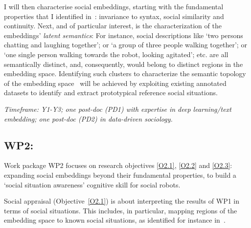 I will then characterise social embeddings, starting with the fundamental
properties that I identified in~\cite{lemaignan2024social}: invariance to
syntax, social similarity and continuity. Next, and of particular interest, is
the characterization of the embeddings' \emph{latent semantics}: For instance,
social descriptions like `two persons chatting and laughing
together'; or `a group of three people walking together'; or `one single person
walking towards the robot, looking agitated'; etc.  are all semantically
distinct, and, consequently, would belong to distinct regions in the embedding
space. Identifying such clusters to characterize the semantic topology of the
embedding space~\cite{sun2023topological} will be achieved by exploiting
existing annotated datasets to identify and extract prototypical reference social situations.

\vspace{1em}
\noindent\emph{ Timeframe: Y1-Y3; one post-doc (PD1) with expertise in
    deep learning/text embedding; one post-doc (PD2) in data-driven sociology.}


\subsection{WP2: \textbf{\WPB}} 

Work package WP2 focuses on research objectives \ref{O2.1}, \ref{O2.2} and \ref{O2.3}:
expanding social embeddings beyond their fundamental properties, to build a
`social situation awareness' cognitive skill for social robots.





Social appraisal (Objective~\ref{O2.1}) is about interpreting the results of WP1
in terms of social situations. This includes, in particular, mapping regions of
the embedding space to known social situations, as identified for instance
in~\cite{kelley2003atlas}. 

